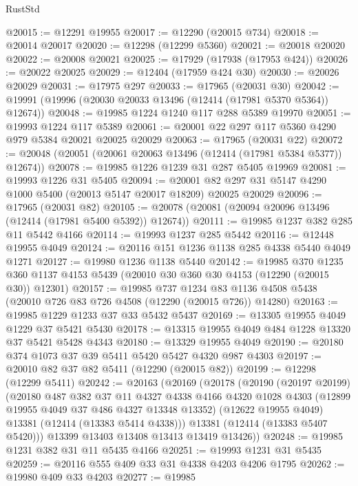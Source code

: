 \begin{lexlean}{RustStd}
\begin{coremodule}
@20015 := @12291 @19955
@20017 := @12290 (@20015 @734)
@20018 := @20014 @20017
@20020 := @12298 (@12299 @5360)
@20021 := @20018 @20020
@20022 := @20008 @20021
@20025 := @17929 (@17938 (@17953 @424))
@20026 := @20022 @20025
@20029 := @12404 (@17959 @424 @30)
@20030 := @20026 @20029
@20031 := @17975 @297
@20033 := @17965 (@20031 @30)
@20042 := @19991 (@19996 (@20030 @20033 @13496 (@12414 (@17981 @5370 @5364)) @12674))
@20048 := @19985 @1224 @1240 @117 @288 @5389 @19970
@20051 := @19993 @1224 @117 @5389
@20061 := @20001 @22 @297 @117 @5360 @4290 @979 @5384 @20021 @20025 @20029
@20063 := @17965 (@20031 @22)
@20072 := @20048 (@20051 (@20061 @20063 @13496 (@12414 (@17981 @5384 @5377)) @12674))
@20078 := @19985 @1226 @1239 @31 @287 @5405 @19969
@20081 := @19993 @1226 @31 @5405
@20094 := @20001 @82 @297 @31 @5147 @4290 @1000 @5400 (@20013 @5147 @20017 @18209) @20025 @20029
@20096 := @17965 (@20031 @82)
@20105 := @20078 (@20081 (@20094 @20096 @13496 (@12414 (@17981 @5400 @5392)) @12674))
@20111 := @19985 @1237 @382 @285 @11 @5442 @4166
@20114 := @19993 @1237 @285 @5442
@20116 := @12448 @19955 @4049
@20124 := @20116 @151 @1236 @1138 @285 @4338 @5440 @4049 @1271
@20127 := @19980 @1236 @1138 @5440
@20142 := @19985
    @370
    @1235
    @360
    @1137
    @4153
    @5439
    (@20010 @30 @360 @30 @4153 (@12290 (@20015 @30)) @12301)
@20157 := @19985
    @737
    @1234
    @83
    @1136
    @4508
    @5438
    (@20010 @726 @83 @726 @4508 (@12290 (@20015 @726)) @14280)
@20163 := @19985 @1229 @1233 @37 @33 @5432 @5437
@20169 := @13305 @19955 @4049 @1229 @37 @5421 @5430
@20178 := @13315 @19955 @4049 @484 @1228 @13320 @37 @5421 @5428 @4343
@20180 := @13329 @19955 @4049
@20190 := @20180 @374 @1073 @37 @39 @5411 @5420 @5427 @4320 @987 @4303
@20197 := @20010 @82 @37 @82 @5411 (@12290 (@20015 @82))
@20199 := @12298 (@12299 @5411)
@20242 := @20163
    (@20169
      (@20178
        (@20190
          (@20197 @20199)
          (@20180
            @487
            @382
            @37
            @11
            @4327
            @4338
            @4166
            @4320
            @1028
            @4303
            (@12899 @19955 @4049 @37 @486 @4327 @13348 @13352)
            (@12622 @19955 @4049)
            @13381
            (@12414 (@13383 @5414 @4338)))
          @13381
          (@12414 (@13383 @5407 @5420)))
        @13399
        @13403
        @13408
        @13413
        @13419
        @13426))
@20248 := @19985 @1231 @382 @31 @11 @5435 @4166
@20251 := @19993 @1231 @31 @5435
@20259 := @20116 @555 @409 @33 @31 @4338 @4203 @4206 @1795
@20262 := @19980 @409 @33 @4203
@20277 := @19985

\end{coremodule}
\end{lexlean}
